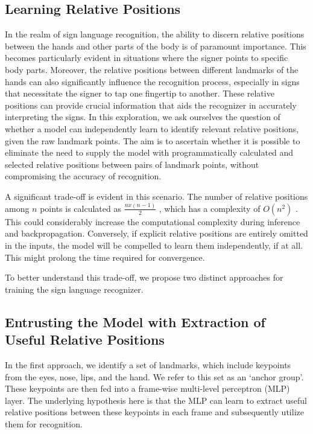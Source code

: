 \documentclass[10pt,twocolumn,letterpaper]{article}
\begin{document}
\begin{CJK*}{UTF8}{bsmi}
\section{Learning Relative Positions}
In the realm of sign language recognition, the ability to discern relative positions between the hands and other parts of the body is of paramount importance. This becomes particularly evident in situations where the signer points to specific body parts. Moreover, the relative positions between different landmarks of the hands can also significantly influence the recognition process, especially in signs that necessitate the signer to tap one fingertip to another. These relative positions can provide crucial information that aids the recognizer in accurately interpreting the signs.
In this exploration, we ask ourselves the question of whether a model can independently learn to identify relevant relative positions, given the raw landmark points. The aim is to ascertain whether it is possible to eliminate the need to supply the model with programmatically calculated and selected relative positions between pairs of landmark points, without compromising the accuracy of recognition.

A significant trade-off is evident in this scenario. The number of relative positions among 
$n$
 points is calculated as 
$\frac{nx(n-1)}{2}$
, which has a complexity of 
$O(n^2)$
. This could considerably increase the computational complexity during inference and backpropagation. Conversely, if explicit relative positions are entirely omitted in the inputs, the model will be compelled to learn them independently, if at all. This might prolong the time required for convergence.

To better understand this trade-off, we propose two distinct approaches for training the sign language recognizer.
\subsection{Entrusting the Model with Extraction of Useful Relative Positions}
In the first approach, we identify a set of landmarks, which include keypoints from the eyes, nose, lips, and the hand. We refer to this set as an ‘anchor group’. These keypoints are then fed into a frame-wise multi-level perceptron (MLP) layer. The underlying hypothesis here is that the MLP can learn to extract useful relative positions between these keypoints in each frame and subsequently utilize them for recognition.

\end{CJK*}
\end{document}

